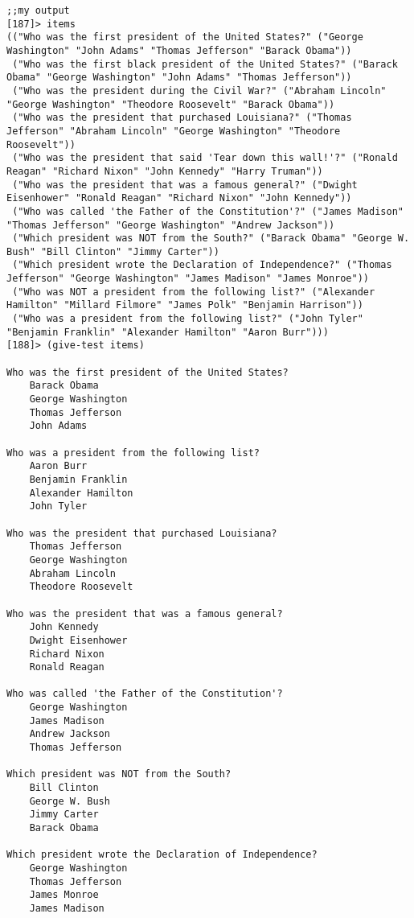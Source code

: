 \documentclass{article}
\begin{document}
\begin{lstlisting}
;;my output
[187]> items
(("Who was the first president of the United States?" ("George Washington" "John Adams" "Thomas Jefferson" "Barack Obama"))
 ("Who was the first black president of the United States?" ("Barack Obama" "George Washington" "John Adams" "Thomas Jefferson"))
 ("Who was the president during the Civil War?" ("Abraham Lincoln" "George Washington" "Theodore Roosevelt" "Barack Obama"))
 ("Who was the president that purchased Louisiana?" ("Thomas Jefferson" "Abraham Lincoln" "George Washington" "Theodore Roosevelt"))
 ("Who was the president that said 'Tear down this wall!'?" ("Ronald Reagan" "Richard Nixon" "John Kennedy" "Harry Truman"))
 ("Who was the president that was a famous general?" ("Dwight Eisenhower" "Ronald Reagan" "Richard Nixon" "John Kennedy"))
 ("Who was called 'the Father of the Constitution'?" ("James Madison" "Thomas Jefferson" "George Washington" "Andrew Jackson"))
 ("Which president was NOT from the South?" ("Barack Obama" "George W. Bush" "Bill Clinton" "Jimmy Carter"))
 ("Which president wrote the Declaration of Independence?" ("Thomas Jefferson" "George Washington" "James Madison" "James Monroe"))
 ("Who was NOT a president from the following list?" ("Alexander Hamilton" "Millard Filmore" "James Polk" "Benjamin Harrison"))
 ("Who was a president from the following list?" ("John Tyler" "Benjamin Franklin" "Alexander Hamilton" "Aaron Burr")))
[188]> (give-test items)

Who was the first president of the United States?
    Barack Obama
    George Washington
    Thomas Jefferson
    John Adams

Who was a president from the following list?
    Aaron Burr
    Benjamin Franklin
    Alexander Hamilton
    John Tyler

Who was the president that purchased Louisiana?
    Thomas Jefferson
    George Washington
    Abraham Lincoln
    Theodore Roosevelt

Who was the president that was a famous general?
    John Kennedy
    Dwight Eisenhower
    Richard Nixon
    Ronald Reagan

Who was called 'the Father of the Constitution'?
    George Washington
    James Madison
    Andrew Jackson
    Thomas Jefferson

Which president was NOT from the South?
    Bill Clinton
    George W. Bush
    Jimmy Carter
    Barack Obama

Which president wrote the Declaration of Independence?
    George Washington
    Thomas Jefferson
    James Monroe
    James Madison


\end{lstlisting}
\end{document}
